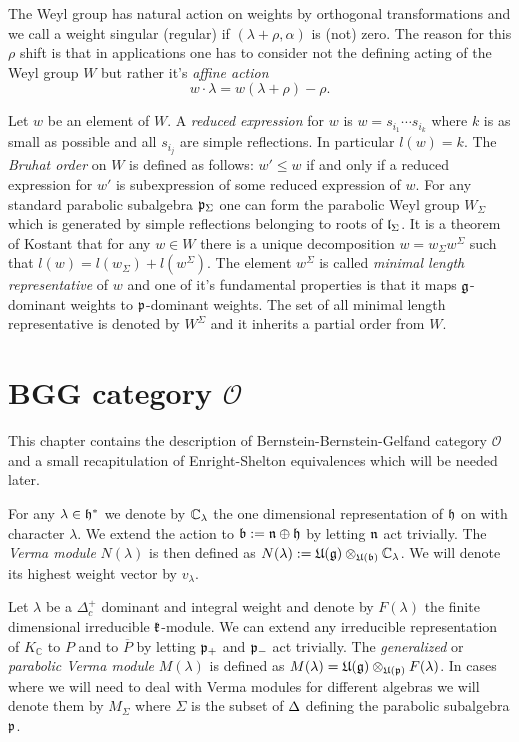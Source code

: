 The Weyl group has natural action on weights by orthogonal transformations and we call a weight singular (regular) if $(\lambda + \rho, \alpha)$ is (not) zero. The reason for this $\rho$ shift is that in applications one has to consider not the defining acting of the Weyl group $W$ but rather it's \emph{affine action} 
\[
 w \cdot \lambda = w(\lambda + \rho) - \rho.
\]

Let $w$ be an element of $W$. A \emph{reduced expression} for $w$ is $w = s_{i_1} \cdots s_{i_k}$ where $k$ is as small as possible and all $s_{i_j}$ are simple reflections. In particular $l(w) = k$. The \emph{Bruhat order} on $W$ is defined as follows: $w' \leq w$ if and only if a reduced expression for $w'$ is subexpression of some reduced expression of $w.$ For any standard parabolic subalgebra $\mathfrak{p}_\Sigma$ one can form the parabolic Weyl group $W_\Sigma$ which is generated by simple reflections belonging to roots of $\mathfrak{l}_\Sigma$. It is a theorem of Kostant \cite{kostant_lie_1961} that for any $w \in W$ there is a unique decomposition $w = w_\Sigma w^\Sigma$ such that $l(w) = l(w_\Sigma) + l(w^\Sigma)$. The element $w^\Sigma$ is called \emph{minimal length representative} of $w$ and one of it's fundamental properties is that it maps $\mathfrak{g}$-dominant weights to $\mathfrak{p}$-dominant weights. The set of all minimal length representative is denoted by $W^\Sigma$ and it inherits a partial order from $W$.


\section[BGG category O]{BGG category $\mathcal{O}$}

This chapter contains the description of Bernstein-Bernstein-Gelfand category $\mathcal{O}$ and a small recapitulation of Enright-Shelton equivalences which will be needed later.

For any $\lambda\in\mathfrak{h}^*$ we denote by $\mathbb{C}_\lambda$ the one dimensional representation of $\mathfrak{h}$ on with character $\lambda$. We extend the action to $\mathfrak{b} := \mathfrak{n}\oplus\mathfrak{h}$ by letting $\mathfrak{n}$ act trivially. The \emph{Verma module} $N(\lambda)$ is then defined as $N(\lambda) := \mathfrak{U(g)}\otimes_{\mathfrak{U(b)}} \mathbb{C}_\lambda$. We will denote its highest weight vector by $v_\lambda$.

Let $\lambda$ be a $\Delta_c^+$ dominant and integral weight and denote by $F(\lambda)$ the finite dimensional irreducible $\mathfrak{k}$-module.  We can extend any irreducible representation of $K_\mathbb{C}$ to $P$ and to $\overline{P}$ by letting $\mathfrak{p}_+$ and $\mathfrak{p}_-$ act trivially. The \emph{generalized} or \emph{parabolic Verma module} $M(\lambda)$ is defined as $M(\lambda) = \mathfrak{U}(\mathfrak{g}) \otimes_{\mathfrak{U}(\mathfrak{p})} F(\lambda)$. In cases where we will need to deal with Verma modules for different algebras we will denote them by $M_\Sigma$ where $\Sigma$ is the subset of $\Delta$ defining the parabolic subalgebra $\mathfrak{p}$. 

